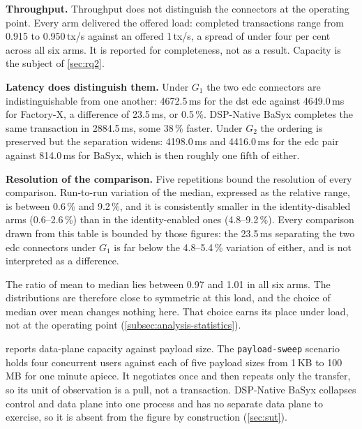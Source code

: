 \pagebreak

\textbf{Throughput.} Throughput does not distinguish the connectors at the operating point. Every arm delivered the offered load: completed transactions range from 0.915 to 0.950\,tx/s against an offered 1\,tx/s, a spread of under four per cent across all six arms. It is reported for completeness, not as a result. Capacity is the subject of \cref{sec:rq2}.

\textbf{Latency does distinguish them.} Under $G_1$ the two \gls{edc} connectors are indistinguishable from one another: 4672.5\,ms for the \gls{dst} \gls{edc} against 4649.0\,ms for Factory-X, a difference of 23.5\,ms, or 0.5\,\%. DSP-Native BaSyx completes the same transaction in 2884.5\,ms, some 38\,\% faster. Under $G_2$ the ordering is preserved but the separation widens: 4198.0\,ms and 4416.0\,ms for the \gls{edc} pair against 814.0\,ms for BaSyx, which is then roughly one fifth of either.

\textbf{Resolution of the comparison.} Five repetitions bound the resolution of every comparison. Run-to-run variation of the median, expressed as the relative range, is between 0.6\,\% and 9.2\,\%, and it is consistently smaller in the identity-disabled arms (0.6--2.6\,\%) than in the identity-enabled ones (4.8--9.2\,\%). Every comparison drawn from this table is bounded by those figures: the 23.5\,ms separating the two \gls{edc} connectors under $G_1$ is far below the 4.8--5.4\,\% variation of either, and is not interpreted as a difference.

The ratio of mean to median lies between 0.97 and 1.01 in all six arms. The distributions are therefore close to symmetric at this load, and the choice of median over mean changes nothing here. That choice earns its place under load, not at the operating point (\cref{subsec:analysis-statistics}).

 reports data-plane capacity against payload size. The \texttt{payload-sweep} scenario holds four concurrent users against each of five payload sizes from 1\,KB to 100\,MB for one minute apiece. It negotiates once and then repeats only the transfer, so its unit of observation is a pull, not a transaction. DSP-Native BaSyx collapses control and data plane into one process and has no separate data plane to exercise, so it is absent from the figure by construction (\cref{sec:sut}).


